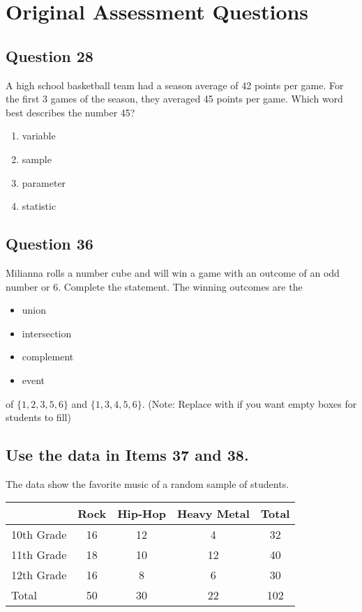 \documentclass[12pt]{article}
\begin{document}
\section*{Original Assessment Questions}

\subsection*{Question 28}
A high school basketball team had a season average of 42 points per game. For the first 3 games of the season, they averaged 45 points per game. Which word best describes the number 45?
\begin{enumerate}[label=\Alph*.]
    \item variable
    \item sample
    \item parameter
    \item statistic
\end{enumerate}

\subsection*{Question 36}
Milianna rolls a number cube and will win a game with an outcome of an odd number or 6. Complete the statement.
The winning outcomes are the
\begin{itemize}
    \item [\XBox] union
    \item [\XBox] intersection
    \item [\XBox] complement
    \item [\XBox] event
\end{itemize}
of \( \{1, 2, 3, 5, 6\} \) and \( \{1, 3, 4, 5, 6\} \).
(Note: Replace \XBox with \Square if you want empty boxes for students to fill)

\subsection*{Use the data in Items 37 and 38.}
The data show the favorite music of a random sample of students.
\begin{center}
\begin{tabular}{l|ccc|c}
    & Rock & Hip-Hop & Heavy Metal & Total \\
    \hline
    10th Grade & 16 & 12 & 4 & 32 \\
    11th Grade & 18 & 10 & 12 & 40 \\
    12th Grade & 16 & 8 & 6 & 30 \\
    \hline
    Total & 50 & 30 & 22 & 102 \\
\end{tabular}
\end{center}
\end{document}
